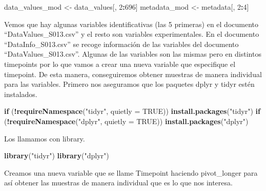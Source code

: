 \documentclass[
]{article}
\newenvironment{Shaded}{\begin{snugshade}}{\end{snugshade}}
\newcommand{\AttributeTok}[1]{\textcolor[rgb]{0.13,0.29,0.53}{#1}}
\newcommand{\ConstantTok}[1]{\textcolor[rgb]{0.56,0.35,0.01}{#1}}
\newcommand{\ControlFlowTok}[1]{\textcolor[rgb]{0.13,0.29,0.53}{\textbf{#1}}}
\newcommand{\DecValTok}[1]{\textcolor[rgb]{0.00,0.00,0.81}{#1}}
\newcommand{\FunctionTok}[1]{\textcolor[rgb]{0.13,0.29,0.53}{\textbf{#1}}}
\newcommand{\NormalTok}[1]{#1}
\newcommand{\OtherTok}[1]{\textcolor[rgb]{0.56,0.35,0.01}{#1}}
\newcommand{\SpecialCharTok}[1]{\textcolor[rgb]{0.81,0.36,0.00}{\textbf{#1}}}
\newcommand{\StringTok}[1]{\textcolor[rgb]{0.31,0.60,0.02}{#1}}
\begin{document}
\begin{Shaded}
\begin{Highlighting}[]
\NormalTok{data\_values\_mod }\OtherTok{\textless{}{-}}\NormalTok{ data\_values[, }\DecValTok{2}\SpecialCharTok{:}\DecValTok{696}\NormalTok{]}
\NormalTok{metadata\_mod }\OtherTok{\textless{}{-}}\NormalTok{ metadata[, }\DecValTok{2}\SpecialCharTok{:}\DecValTok{4}\NormalTok{]}
\end{Highlighting}
\end{Shaded}

Vemos que hay algunas variables identificativas (las 5 primeras) en el
documento ``DataValues\_S013.csv'' y el resto son variables
experimentales. En el documento ``DataInfo\_S013.csv'' se recoge
información de las variables del documento ``DataValues\_S013.csv''.
Algunas de las variables son las mismas pero en distintos timepoints por
lo que vamos a crear una nueva variable que especifique el timepoint. De
esta manera, conseguiremos obtener muestras de manera individual para
las variables. Primero nos aseguramos que los paquetes dplyr y tidyr
estén instalados.

\begin{Shaded}
\begin{Highlighting}[]
\ControlFlowTok{if}\NormalTok{ (}\SpecialCharTok{!}\FunctionTok{requireNamespace}\NormalTok{(}\StringTok{"tidyr"}\NormalTok{, }\AttributeTok{quietly =} \ConstantTok{TRUE}\NormalTok{)) }\FunctionTok{install.packages}\NormalTok{(}\StringTok{"tidyr"}\NormalTok{)}
\ControlFlowTok{if}\NormalTok{ (}\SpecialCharTok{!}\FunctionTok{requireNamespace}\NormalTok{(}\StringTok{"dplyr"}\NormalTok{, }\AttributeTok{quietly =} \ConstantTok{TRUE}\NormalTok{)) }\FunctionTok{install.packages}\NormalTok{(}\StringTok{"dplyr"}\NormalTok{)}
\end{Highlighting}
\end{Shaded}

Los llamamos con library.

\begin{Shaded}
\begin{Highlighting}[]
\FunctionTok{library}\NormalTok{(}\StringTok{"tidyr"}\NormalTok{)}
\FunctionTok{library}\NormalTok{(}\StringTok{"dplyr"}\NormalTok{)}
\end{Highlighting}
\end{Shaded}

Creamos una nueva variable que se llame Timepoint haciendo pivot\_longer
para así obtener las muestras de manera individual que es lo que nos
interesa.
\end{document}
